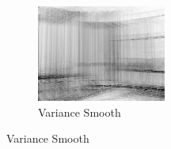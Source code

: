 \documentclass[10pt]{report}
\begin{document}
\begin{figure}[H]
\begin{subfigure}[b]{0.3\textwidth}
                \centering
                \includegraphics[width=\textwidth]{D1-variance.png}
                \caption{Variance Smooth}
                \label{fig:mouse}
        \end{subfigure}
        

\end{figure}
\end{document}
